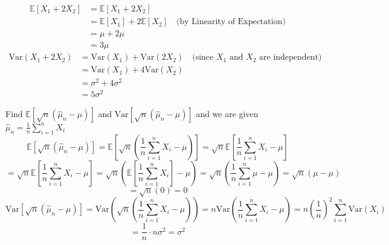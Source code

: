 \documentclass{article}
\begin{document}
\begin{aprob}
\begin{tcolorbox}[colback=lightgray!10!white, colframe=black, title=A4.b]
    \begin{align*}
    \mathbb{E}[X_1 + 2X_2] &= \mathbb{E}[X_1 + 2X_2] \\
    &= \mathbb{E}[X_1] + 2\mathbb{E}[X_2] \quad \text{(by Linearity of Expectation)} \\
    &= \mu + 2\mu \\
    &= 3\mu
    \end{align*}
    \begin{align*}
    \text{Var}(X_1 + 2X_2) &= \text{Var}(X_1) + \text{Var}(2X_2) \quad \text{(since } X_1 \text{ and } X_2 \text{ are independent)} \\
    &= \text{Var}(X_1) + 4\text{Var}(X_2) \\
    &= \sigma^2 + 4\sigma^2 \\
    &= 5\sigma^2
    \end{align*}
    \end{tcolorbox}
    \begin{tcolorbox}[colback=lightgray!10!white, colframe=black, title=A4.c]
    Find $\mathbb{E}[\sqrt{n}(\hat{\mu}_n - \mu)]$ and $\text{Var}[\sqrt{n}(\hat{\mu}_n - \mu)]$ and we are given $\hat{\mu}_n = \frac{1}{n}\sum_{i=1}^n X_i$
    \[
    \mathbb{E}[\sqrt{n}(\hat{\mu}_n - \mu)] = \mathbb{E}\left[\sqrt{n}\left(\frac{1}{n}\sum_{i=1}^n X_i - \mu\right)\right] = \sqrt{n}\mathbb{E}\left[\frac{1}{n}\sum_{i=1}^n X_i - \mu\right]
    \]
    \[
    = \sqrt{n}\mathbb{E}\left[\frac{1}{n}\sum_{i=1}^n X_i - \mu\right] = \sqrt{n}\left(\mathbb{E}\left[\frac{1}{n}\sum_{i=1}^n X_i\right] - \mu\right) = \sqrt{n}\left(\frac{1}{n}\sum_{i=1}^n \mu - \mu\right) = \sqrt{n}(\mu - \mu)
    \]
    \[
    = \sqrt{n}(0) = 0
    \]
    \[
    \text{Var}[\sqrt{n}(\hat{\mu}_n - \mu)] = \text{Var}\left(\sqrt{n}\left(\frac{1}{n}\sum_{i=1}^n X_i - \mu\right)\right) = n\text{Var}\left(\frac{1}{n}\sum_{i=1}^n X_i - \mu\right) = n\left(\frac{1}{n}\right)^2\sum_{i=1}^n \text{Var}(X_i)
    \]
    \[
    = \frac{1}{n} \cdot n\sigma^2 = \sigma^2
    \]
    \end{tcolorbox}
\end{aprob}
\end{document}
